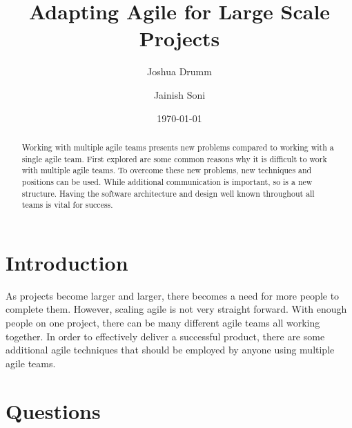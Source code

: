 \documentclass[sigplan,screen]{acmart}
\begin{document}
\title{Adapting Agile for Large Scale Projects}

\author{Joshua Drumm}

\author{Jainish Soni}

\date{\today}

\begin{abstract}
Working with multiple agile teams presents new problems compared to working with a single agile team. First explored are some common reasons why it is difficult to work with multiple agile teams. To overcome these new problems, new techniques and positions can be used. While additional communication is important, so is a new structure. Having the software architecture and design well known throughout all teams is vital for success.
\end{abstract}


\maketitle


\section{Introduction}
As projects become larger and larger, there becomes a need for more people to complete them. However, scaling agile is not very straight forward. With enough people on one project, there can be many different agile teams all working together. In order to effectively deliver a successful product, there are some additional agile techniques that should be employed by anyone using multiple agile teams.

\section{Questions}
\end{document}
